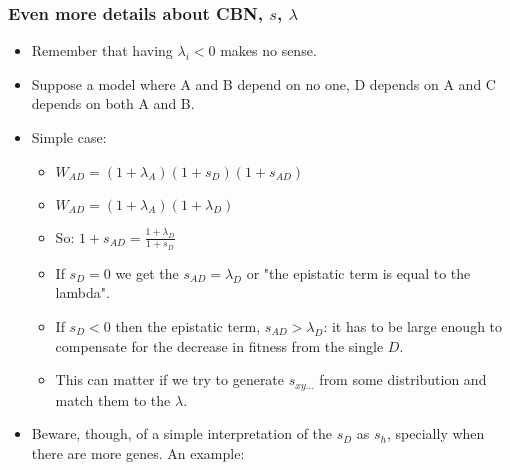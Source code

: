\documentclass[11pt]{article}
\begin{document}
\subsubsection{Even more details about CBN, \(s\), \(\lambda\)}
\label{sec:orgcc4dcbe}
\begin{itemize}
\item Remember that having \(\lambda_i < 0\) makes no sense.

\item Suppose a model where A and B depend on no one, D depends on A and C depends on both A and B.

\item Simple case:
\begin{itemize}
\item \(W_{AD} = (1 + \lambda_A) (1 + s_D) (1 + s_{AD})\)
\item \(W_{AD} = (1 + \lambda_A) (1 + \lambda_D)\)
\item So: \(1 + s_{AD} = \frac{1 + \lambda_D}{1 + s_D}\)
\item If \(s_D = 0\) we get the \(s_{AD} = \lambda_D\) or "the epistatic term is     equal to the lambda".
\item If \(s_D < 0\) then the epistatic term, \(s_{AD} > \lambda_D\): it has to be large enough to compensate for the decrease in fitness from the single \(D\).
\item This can matter if we try to generate \(s_{xy\ldots}\) from some
distribution and match them to the \(\lambda\).
\end{itemize}

\item Beware, though, of a simple interpretation of the \(s_D\) as \(s_h\),
specially when there are more genes. An example:


\end{itemize}
\end{document}

